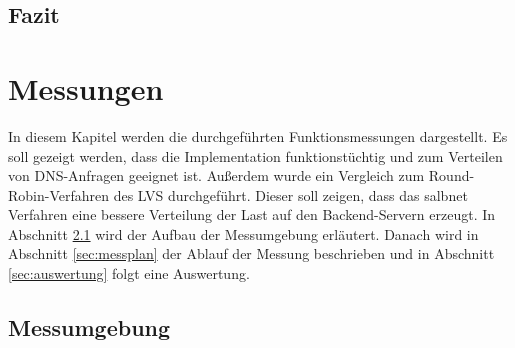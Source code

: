 \documentclass[a4paper, 12pt, BCOR10mm, DIV12, toc=bibliography, toc=listof, german]{scrbook}
\begin{document}
		
		

		

		
			

		\section{Fazit} %
		\label{sec:implementierung-fazit}
		


	\chapter{Messungen} %
	\label{cha:messungen}

		In diesem Kapitel werden die durchgeführten Funktionsmessungen dargestellt. Es soll gezeigt
		werden, dass die Implementation funktionstüchtig und zum Verteilen von DNS-Anfragen geeignet
		ist. Außerdem wurde ein Vergleich zum Round-Robin-Verfahren des LVS durchgeführt. Dieser soll
		zeigen, dass das salbnet Verfahren eine bessere Verteilung der Last auf den Backend-Servern
		erzeugt. In Abschnitt \ref{sec:messumgebung} wird der Aufbau der Messumgebung erläutert. Danach
		wird in Abschnitt \ref{sec:messplan} der Ablauf der Messung beschrieben und in Abschnitt
		\ref{sec:auswertung} folgt eine Auswertung.

		\section{Messumgebung} %
		\label{sec:messumgebung}
	
\end{document}
